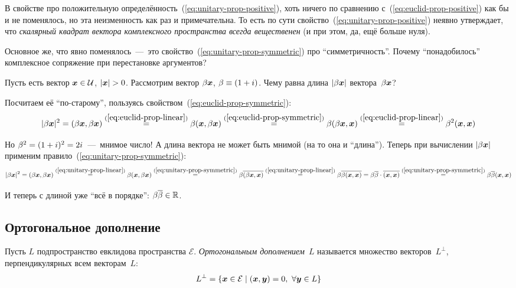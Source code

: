\documentclass[a4paper,12pt]{article}
\begin{document}
  В свойстве про положительную определённость~(\ref{eq:unitary-prop-positive}), хоть ничего по сравнению с~(\ref{eq:euclid-prop-positive}) как бы и не поменялось, но эта неизменность как раз и примечательна.
  То есть по сути свойство~(\ref{eq:unitary-prop-positive}) неявно утверждает, что \emph{скалярный квадрат вектора комплексного пространства всегда вещественен} (и при этом, да, ещё больше нуля).
  
  Основное же, что явно поменялось~---~это свойство~(\ref{eq:unitary-prop-symmetric}) про ``симметричность''.
  Почему ``понадобилось'' комплексное сопряжение при перестановке аргументов?
  
  \begin{example}
    Пусть есть вектор $\bds x \hm\in \mathcal U$, $|\bds x| \hm> 0$.
    Рассмотрим вектор $\beta \boldsymbol x$, $\beta \hm\equiv (1 \hm+ i)$.
    Чему равна длина $|\beta \boldsymbol x|$ вектора~$\beta \boldsymbol x$?
    
    Посчитаем её ``по-старому'', пользуясь свойством~(\ref{eq:euclid-prop-symmetric}):
    \[
      |\beta \boldsymbol x|^2 = (\beta \boldsymbol x, \beta \boldsymbol x)
      \overset{(\ref{eq:euclid-prop-linear})}{=} \beta (\boldsymbol x, \beta \boldsymbol x)
      \overset{(\ref{eq:euclid-prop-symmetric})}{=} \beta (\beta \boldsymbol x, \boldsymbol x)
      \overset{(\ref{eq:euclid-prop-linear})}{=} \beta^2 (\boldsymbol x, \boldsymbol x)
    \]
    
    Но $\beta^2 \hm= (1 \hm+ i)^2 \hm= 2i$~---~мнимое число!
    А длина вектора не может быть мнимой (на то она и ``длина'').
    Теперь при вычислении $|\beta \boldsymbol x|$ применим правило~(\ref{eq:unitary-prop-symmetric}):
    \[
      |\beta \boldsymbol x|^2 = (\beta \boldsymbol x, \beta \boldsymbol x)
      \overset{(\ref{eq:unitary-prop-linear})}{=} \beta (\boldsymbol x, \beta \boldsymbol x)
      \overset{(\ref{eq:unitary-prop-symmetric})}{=} \beta \overline{(\beta \boldsymbol x, \boldsymbol x)}
      \overset{(\ref{eq:unitary-prop-linear})}{=} \beta \overline{\beta (\boldsymbol x, \boldsymbol x)}
      = \beta \overline{\beta} \cdot \overline{(\boldsymbol x, \boldsymbol x)}
      \overset{(\ref{eq:unitary-prop-symmetric})}{=} \beta \overline{\beta} (\boldsymbol x, \boldsymbol x)
    \]
    
    И теперь с длиной уже ``всё в порядке'': $\beta \overline{\beta} \hm\in \RR$.
  \end{example}
  
  
  \subsection{Ортогональное дополнение}
  
  \begin{definition}
    Пусть $L$ подпространство евклидова пространства $\mathcal E$.
    \emph{Ортогональным дополнением}~$L$ называется множество векторов~$L^{\perp}$, перпендикулярных всем векторам~$L$:
    \[
      L^{\perp} = \{\boldsymbol x \in \mathcal E \mid (\boldsymbol x, \boldsymbol y) = 0,\ \forall \boldsymbol y \in L\}
    \]
  \end{definition}
  
\end{document}
